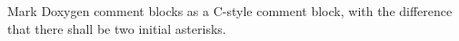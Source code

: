 \subsection*{\doxygenRule{}}

Mark Doxygen comment blocks as a C-style comment block, with the difference that there shall be two initial asterisks.

\noindent
\begin{minipage}{0.47\textwidth}
    
\end{minipage}
\hfill
\begin{minipage}{0.47\textwidth}
    
\end{minipage}
